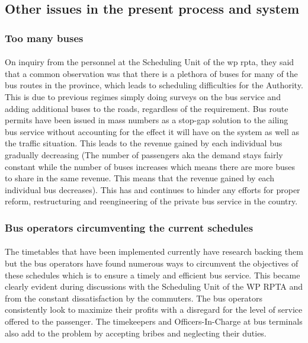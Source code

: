 \subsection{Other issues in the present process and system}

\subsubsection{Too many buses} 

\paragraph{} On inquiry from the personnel at the Scheduling Unit of the \acrshort{wp} \acrshort{rpta}, they said that a common observation was that there is a plethora of buses for many of the bus routes in the province, which leads to scheduling difficulties for the Authority. This is due to previous regimes simply doing surveys on the bus service and adding additional buses to the roads, regardless of the requirement. Bus route permits have been issued in mass numbers as a stop-gap solution to the ailing bus service without accounting for the effect it will have on the system as well as the traffic situation. This leads to the revenue gained by each individual bus gradually decreasing (The number of passengers aka the demand stays fairly constant while the number of buses increases which means there are more buses to share in the same revenue. This means that the revenue gained by each individual bus decreases). This has and continues to hinder any efforts for proper reform, restructuring and reengineering of the private bus service in the country.

\subsubsection{Bus operators circumventing the current schedules} 

\paragraph{} The timetables that have been implemented currently have research backing them but the bus operators have found numerous ways to circumvent the objectives of these schedules which is to ensure a timely and efficient bus service. This became clearly evident during discussions with the Scheduling Unit of the WP RPTA and from the constant dissatisfaction by the commuters. The bus operators consistently look to maximize their profits with a disregard for the level of service offered to the passenger. The timekeepers and Officers-In-Charge at bus terminals also add to the problem by accepting bribes and neglecting their duties.

